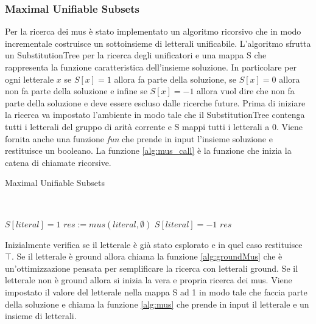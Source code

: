 \documentclass[./main.tex]{subfiles}
\begin{document}
\subsubsection{Maximal Unifiable Subsets}

Per la ricerca dei mus è stato implementato un algoritmo ricorsivo che in modo incrementale costruisce un sottoinsieme di letterali unificabile.
L'algoritmo sfrutta un SubstitutionTree per la ricerca degli unificatori e una mappa S che rappresenta la funzione caratteristica 
dell'insieme soluzione. 
In particolare per ogni letterale $x$ se $S[x] = 1$ allora fa parte della soluzione, se $S[x] = 0$ allora non fa parte della soluzione
e infine se $S[x] = -1$ allora vuol dire che non fa parte della soluzione e deve essere escluso dalle ricerche future.
Prima di iniziare la ricerca va impostato l'ambiente in modo tale che il SubstitutionTree contenga tutti i letterali 
del gruppo di arità corrente e S mappi tutti i letterali a 0. 
Viene fornita anche una funzione \textit{fun} che prende in input l'insieme soluzione e restituisce un booleano.
La funzione \ref{alg:mus_call} è la funzione che inizia la catena di chiamate ricorsive. 






\begin{algorithm}[H] \label{alg:mus_call}
    \caption{Maximal Unifiable Subsets}
    \\

\nl {}
\nl {}

$S[literal] = 1$\;
$res := mus(literal, \emptyset)$\;
$S[literal] = -1$\;
\Return $res$\;
\end{algorithm}

Inizialmente verifica se il letterale è già stato esplorato e in quel caso restituisce $\top$.
Se il letterale è ground allora chiama la funzione \ref{alg:groundMus} che è un'ottimizzazione pensata 
per semplificare la ricerca con letterali ground.
Se il letterale non è ground allora si inizia la vera e propria ricerca dei mus.
Viene impostato il valore del letterale nella mappa S ad 1 in modo tale che faccia parte della soluzione 
e chiama la funzione \ref{alg:mus} che prende in input il letterale e un insieme di letterali.
\end{document}
